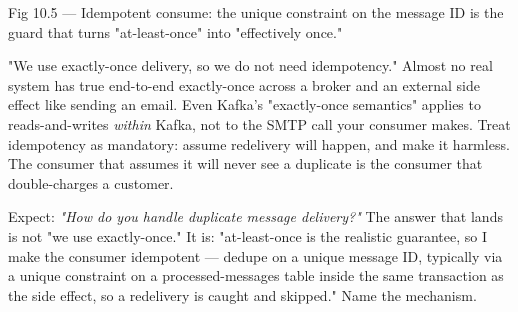 \begin{wbfigure}{Fig 10.5 --- Idempotent consume: the unique constraint on the message ID is the guard that turns "at-least-once" into "effectively once."}
\end{wbfigure}

\begin{misconception}
"We use exactly-once delivery, so we do not need idempotency." Almost no real system has true end-to-end exactly-once across a broker and an external side effect like sending an email. Even Kafka's "exactly-once semantics" applies to reads-and-writes \emph{within} Kafka, not to the SMTP call your consumer makes. Treat idempotency as mandatory: assume redelivery will happen, and make it harmless. The consumer that assumes it will never see a duplicate is the consumer that double-charges a customer.
\end{misconception}

\begin{interview}
Expect: \emph{"How do you handle duplicate message delivery?"} The answer that lands is not "we use exactly-once." It is: "at-least-once is the realistic guarantee, so I make the consumer idempotent --- dedupe on a unique message ID, typically via a unique constraint on a processed-messages table inside the same transaction as the side effect, so a redelivery is caught and skipped." Name the mechanism.
\end{interview}

